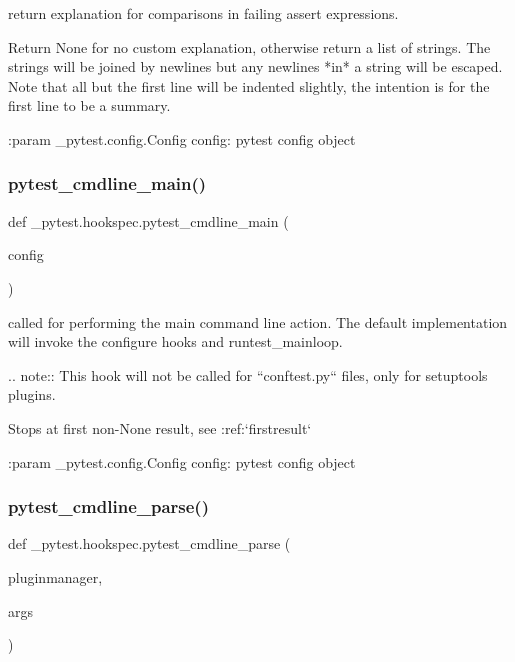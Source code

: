 \begin{DoxyVerb}return explanation for comparisons in failing assert expressions.

Return None for no custom explanation, otherwise return a list
of strings.  The strings will be joined by newlines but any newlines
*in* a string will be escaped.  Note that all but the first line will
be indented slightly, the intention is for the first line to be a summary.

:param _pytest.config.Config config: pytest config object
\end{DoxyVerb}
 \mbox{\label{namespace__pytest_1_1hookspec_aeeae2cf38a103f561f3c656a013fb6b9}} 
\subsubsection{\texorpdfstring{pytest\+\_\+cmdline\+\_\+main()}{pytest\_cmdline\_main()}}
{\footnotesize\ttfamily def \+\_\+pytest.\+hookspec.\+pytest\+\_\+cmdline\+\_\+main (\begin{DoxyParamCaption}\item[{}]{config }\end{DoxyParamCaption})}

\begin{DoxyVerb}called for performing the main command line action. The default
implementation will invoke the configure hooks and runtest_mainloop.

.. note::
    This hook will not be called for ``conftest.py`` files, only for setuptools plugins.

Stops at first non-None result, see :ref:`firstresult`

:param _pytest.config.Config config: pytest config object
\end{DoxyVerb}
 \mbox{\label{namespace__pytest_1_1hookspec_ae7c59749300a9d5c8fffac064e3a2890}} 
\subsubsection{\texorpdfstring{pytest\+\_\+cmdline\+\_\+parse()}{pytest\_cmdline\_parse()}}
{\footnotesize\ttfamily def \+\_\+pytest.\+hookspec.\+pytest\+\_\+cmdline\+\_\+parse (\begin{DoxyParamCaption}\item[{}]{pluginmanager,  }\item[{}]{args }\end{DoxyParamCaption})}


